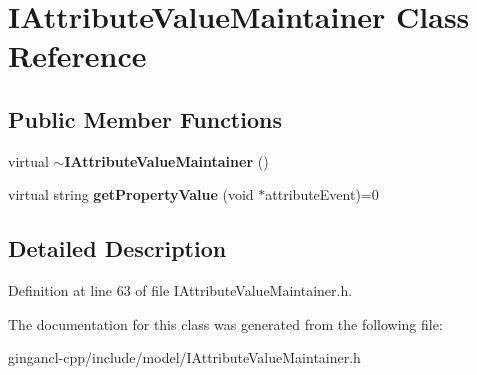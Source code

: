 \section{IAttributeValueMaintainer Class Reference}
\label{classbr_1_1pucrio_1_1telemidia_1_1ginga_1_1ncl_1_1model_1_1event_1_1IAttributeValueMaintainer}
\subsection*{Public Member Functions}
\begin{CompactItemize}
\item 
virtual {\bf $\sim$IAttributeValueMaintainer} ()\label{classbr_1_1pucrio_1_1telemidia_1_1ginga_1_1ncl_1_1model_1_1event_1_1IAttributeValueMaintainer_f38117c228ec2e282140b49fa958244d}

\item 
virtual string \textbf{getPropertyValue} (void $\ast$attributeEvent)=0\label{classbr_1_1pucrio_1_1telemidia_1_1ginga_1_1ncl_1_1model_1_1event_1_1IAttributeValueMaintainer_97603889f3cf41a19123480680a38c00}

\end{CompactItemize}


\subsection{Detailed Description}




Definition at line 63 of file IAttributeValueMaintainer.h.

The documentation for this class was generated from the following file:\begin{CompactItemize}
\item 
gingancl-cpp/include/model/IAttributeValueMaintainer.h\end{CompactItemize}
